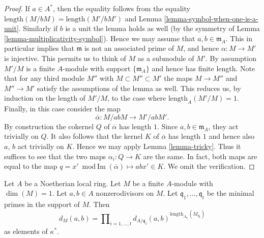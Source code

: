 \begin{proof}
If $a \in A^*$, then the equality follows from the
equality $\text{length}(M/bM) = \text{length}(M'/bM')$
and Lemma \ref{lemma-symbol-when-one-is-a-unit}.
Similarly if $b$ is a unit the lemma holds as well
(by the symmetry of Lemma \ref{lemma-multiplicativity-symbol}).
Hence we may assume that $a, b \in \mathfrak m_A$.
This in particular implies that $\mathfrak m$ is not
an associated prime of $M$, and hence $\alpha : M \to M'$
is injective. This permits us to think of $M$ as a submodule of $M'$.
By assumption $M'/M$ is a finite $A$-module with support
$\{\mathfrak m_A\}$ and hence has finite length.
Note that for any third module $M''$ with $M \subset M'' \subset M'$
the maps $M \to M''$ and $M'' \to M'$ satisfy the assumptions of the lemma
as well. This reduces us, by induction on the length of $M'/M$,
to the case where $\text{length}_A(M'/M) = 1$.
Finally, in this case consider the map
$$
\overline{\alpha} : M/abM \longrightarrow M'/abM'.
$$
By construction the cokernel $Q$ of $\overline{\alpha}$ has
length $1$. Since $a, b \in \mathfrak m_A$, they act trivially on
$Q$. It also follows that the kernel $K$ of $\overline{\alpha}$ has
length $1$ and hence also $a$, $b$ act trivially on $K$.
Hence we may apply Lemma \ref{lemma-tricky}. Thus it suffices to see
that the two maps $\alpha_i : Q \to K$ are the same.
In fact, both maps are equal to the map
$q = x' \bmod \text{Im}(\overline{\alpha}) \mapsto abx' \in K$.
We omit the verification.
\end{proof}

\begin{lemma}
\label{lemma-compute-symbol-M}
Let $A$ be a Noetherian local ring.
Let $M$ be a finite $A$-module with $\dim(M) = 1$.
Let $a, b \in A$ nonzerodivisors on $M$.
Let $\mathfrak q_1, \ldots, \mathfrak q_t$ be the minimal
primes in the support of $M$. Then
$$
d_M(a, b)
=
\prod\nolimits_{i = 1, \ldots, t}
d_{A/\mathfrak q_i}(a, b)^{
\text{length}_{A_{\mathfrak q_i}}(M_{\mathfrak q_i})}
$$
as elements of $\kappa^*$.
\end{lemma}

